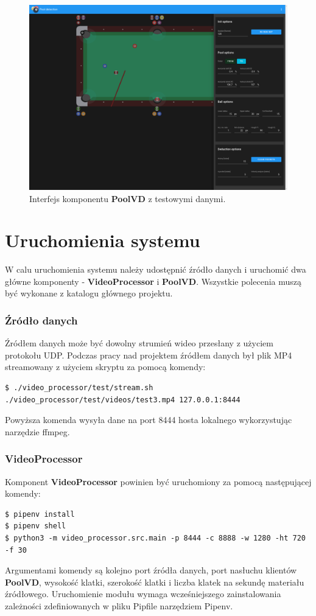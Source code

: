 \documentclass[12pt]{article}
\begin{document}
\begin{figure}[H]
    \centering
    \includegraphics[width=\linewidth]{./images/interface.png}
    \caption{Interfejs komponentu \textbf{PoolVD} z testowymi danymi.}
    \label{interface}
\end{figure}

\section{Uruchomienia systemu}
W calu uruchomienia systemu należy udostępnić źródło danych i uruchomić dwa główne komponenty - \textbf{VideoProcessor} i \textbf{PoolVD}. Wszystkie polecenia muszą być wykonane z katalogu głównego projektu.

\subsubsection{Źródło danych}
Źródłem danych może być dowolny strumień wideo przesłany z użyciem protokołu UDP. Podczas pracy nad projektem źródłem danych był plik MP4 streamowany z użyciem skryptu za pomocą komendy:
\begin{lstlisting}
$ ./video_processor/test/stream.sh ./video_processor/test/videos/test3.mp4 127.0.0.1:8444
\end{lstlisting}
Powyższa komenda wysyła dane na port 8444 hosta lokalnego wykorzystując narzędzie ffmpeg.
\subsubsection{VideoProcessor}
Komponent \textbf{VideoProcessor} powinien być uruchomiony za pomocą następującej komendy:
\begin{lstlisting}
$ pipenv install
$ pipenv shell
$ python3 -m video_processor.src.main -p 8444 -c 8888 -w 1280 -ht 720 -f 30
\end{lstlisting}
Argumentami komendy są kolejno port źródła danych, port nasłuchu klientów \textbf{PoolVD}, wysokość klatki, szerokość klatki i liczba klatek na sekundę materiału źródłowego. Uruchomienie modułu wymaga wcześniejszego zainstalowania zależności zdefiniowanych w pliku Pipfile narzędziem Pipenv.
\end{document}
